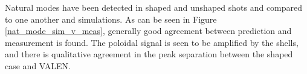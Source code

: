 \documentclass[aps,prl,twocolumn,superscriptaddress,groupedaddress]{revtex4}  %
\begin{document}

	Natural modes have been detected in shaped and unshaped shots and compared to one another and simulations.  As can be seen in Figure \ref{nat_mode_sim_v_meas}, generally good agreement between prediction and measurement is found.  The poloidal signal is seen to be amplified by the shells, and there is qualitative agreement in the peak separation between the shaped case and VALEN.  %
\end{document}
